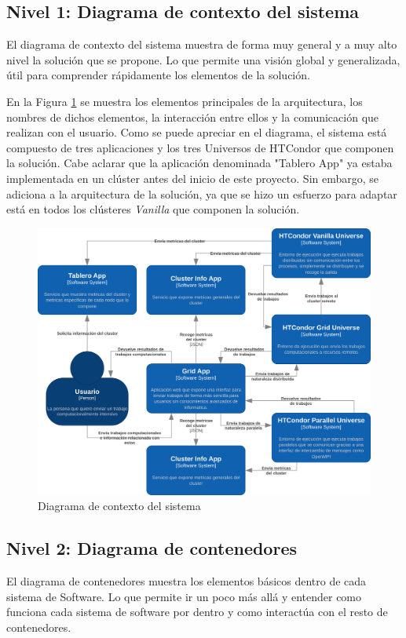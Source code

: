 \subsection{Nivel 1: Diagrama de contexto del sistema}
\noindent
El diagrama de contexto del sistema muestra de forma muy general y a muy alto nivel la solución que se propone. Lo que permite una visión global y generalizada, útil para comprender rápidamente los elementos de la solución.

En la Figura \ref{fig:C4Nivel1} se muestra los elementos principales de la arquitectura, los nombres de dichos elementos, la interacción entre ellos y la comunicación que realizan con el usuario. Como se puede apreciar en el diagrama, el sistema está compuesto de tres aplicaciones y los tres Universos de HTCondor que componen la solución. Cabe aclarar que la aplicación denominada "Tablero App" ya estaba implementada en un clúster antes del inicio de este proyecto. Sin embargo, se adiciona a la arquitectura de la solución, ya que se hizo un esfuerzo para adaptar está en todos los clústeres \textit{Vanilla} que componen la solución.

\begin{figure}[H]
	\centering
	\includegraphics[scale=0.1]{tablas-images/C4/Diagramas HTCondor-Nivel 1.drawio.png}
	\caption{Diagrama de contexto del sistema}
    \label{fig:C4Nivel1}
\end{figure}

\subsection{Nivel 2: Diagrama de contenedores}
\noindent
El diagrama de contenedores muestra los elementos básicos dentro de cada sistema de Software. Lo que permite ir un poco más allá y entender como funciona cada sistema de software por dentro y como interactúa con el resto de contenedores.

